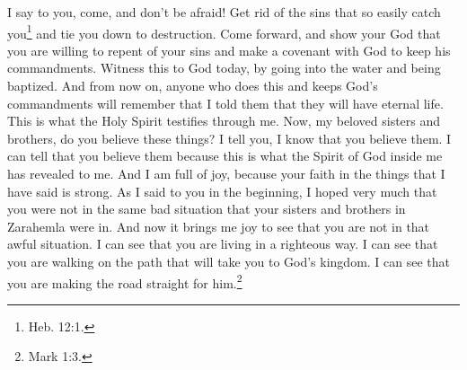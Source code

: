 \bverse \iffalse Yea, I say unto you come and fear not, and lay aside every sin, which easily doth beset you, which doth bind you down to destruction, yea, come and go forth, and show unto your God that ye are willing to repent of your sins and enter into a covenant with him to keep his commandments, and witness it unto him this day by going into the waters of baptism. \fi
I say to you, come, and don't be afraid! Get rid of the sins that so easily catch you\footnote{Heb. 12:1.} and tie you down to destruction. Come forward, and show your God that you are willing to repent of your sins and make a covenant with God to keep his commandments. Witness this to God today, by going into the water and being baptized.
\bverse \iffalse And whosoever doeth this, and keepeth the commandments of God from thenceforth, the same will remember that I say unto him, yea, he will remember that I have said unto him, he shall have eternal life, according to the testimony of the Holy Spirit, which testifieth in me. \fi
And from now on, anyone who does this and keeps God's commandments will remember that I told them that they will have eternal life. This is what the Holy Spirit testifies through me.
\bverse \iffalse And now my beloved brethren, do you believe these things?  Behold, I say unto you, yea, I know that ye believe them; and the way that I know that ye believe them is by the manifestation of the Spirit which is in me. And now because your faith is strong concerning that, yea, concerning the things which I have spoken, great is my joy. \fi
Now, my beloved sisters and brothers, do you believe these things? I tell you, I know that you believe them. I can tell that you believe them because this is what the Spirit of God inside me has revealed to me. And I am full of joy, because your faith in the things that I have said is strong.
\bverse \iffalse For as I said unto you from the beginning, that I had much desire that ye were not in the state of dilemma like your brethren, even so I have found that my desires have been gratified. \fi
As I said to you in the beginning, I hoped very much that you were not in the same bad situation that your sisters and brothers in Zarahemla were in. And now it brings me joy to see that you are not in that awful situation.
\bverse \iffalse For I perceive that ye are in the paths of righteousness; I perceive that ye are in the path which leads to the kingdom of God; yea, I perceive that ye are making his paths straight. \fi
I can see that you are living in a righteous way. I can see that you are walking on the path that will take you to God's kingdom. I can see that you are making the road straight for him.\footnote{Mark 1:3.}
